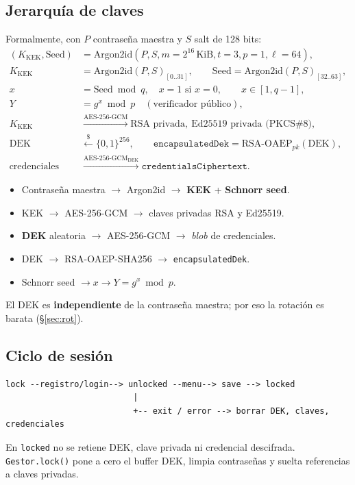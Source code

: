 \documentclass[11pt,a4paper]{article}
\begin{document}
\subsection{Jerarquía de claves}
Formalmente, con $P$ contraseña maestra y $S$ salt de 128 bits:
\begin{align}
  (K_{\text{KEK}}, \text{Seed}) &= \text{Argon2id}(P, S, m{=}2^{16}\,\text{KiB}, t{=}3, p{=}1, \ell{=}64),\\
  K_{\text{KEK}} &= \text{Argon2id}(P,S)_{[0..31]}, \qquad \text{Seed} = \text{Argon2id}(P,S)_{[32..63]},\\
  x &= \text{Seed} \bmod q,\quad x{=}1 \text{ si } x{=}0,\qquad x \in [1, q-1],\\
  Y &= g^{x} \bmod p \quad (\text{verificador público}),\\
  K_{\text{KEK}} &\xrightarrow{\text{AES-256-GCM}} \text{RSA privada},\ \text{Ed25519 privada (PKCS\#8)},\\
  \text{DEK} &\xleftarrow{\$} \{0,1\}^{256},\qquad \texttt{encapsulatedDek} = \text{RSA-OAEP}_{pk}(\text{DEK}),\\
  \text{credenciales} &\xrightarrow{\text{AES-256-GCM}_{\text{DEK}}} \texttt{credentialsCiphertext}.
\end{align}
\begin{itemize}
  \item Contraseña maestra $\to$ Argon2id $\to$ \textbf{KEK} + \textbf{Schnorr seed}.
  \item KEK $\to$ AES-256-GCM $\to$ claves privadas RSA y Ed25519.
  \item \textbf{DEK} aleatoria $\to$ AES-256-GCM $\to$ \emph{blob} de credenciales.
  \item DEK $\to$ RSA-OAEP-SHA256 $\to$ \texttt{encapsulatedDek}.
  \item Schnorr seed $\to x \to Y = g^x \bmod p$.
\end{itemize}
El DEK es \textbf{independiente} de la contraseña maestra; por eso la rotación es
barata (§\ref{sec:rot}).

\subsection{Ciclo de sesión}
\begin{lstlisting}
lock --registro/login--> unlocked --menu--> save --> locked
                          |
                          +-- exit / error --> borrar DEK, claves, credenciales
\end{lstlisting}
En \texttt{locked} no se retiene DEK, clave privada ni credencial descifrada.
\texttt{Gestor.lock()} pone a cero el buffer DEK, limpia contraseñas y suelta
referencias a claves privadas.
\end{document}
